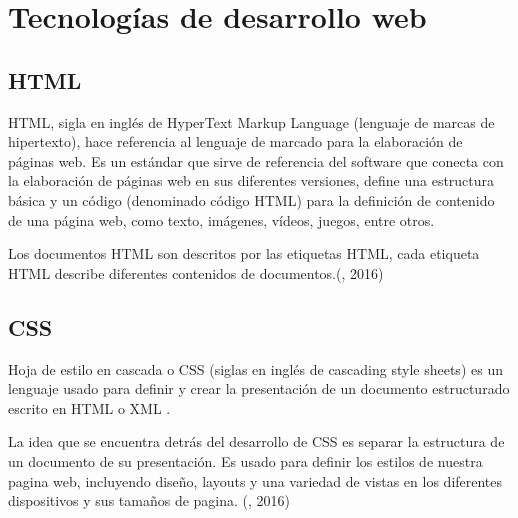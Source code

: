 

		
		




\section{Tecnologías de desarrollo web}

\subsection{HTML}

\setlength{\parskip}{5mm}

HTML, sigla en inglés de HyperText Markup Language (lenguaje de marcas de hipertexto), hace referencia al lenguaje de marcado para la elaboración de páginas web. Es un estándar que sirve de referencia del software que conecta con la elaboración de páginas web en sus diferentes versiones, define una estructura básica y un código (denominado código HTML) para la definición de contenido de una página web, como texto, imágenes, vídeos, juegos, entre otros. 

Los documentos HTML son descritos por las etiquetas HTML, cada etiqueta HTML describe diferentes contenidos de documentos.(\citet{htmlbib}, 2016)

\setlength{\parskip}{0mm}

\subsection{CSS}
\setlength{\parskip}{5mm}
Hoja de estilo en cascada o CSS (siglas en inglés de cascading style sheets) es un lenguaje usado para definir y crear la presentación de un documento estructurado escrito en HTML o XML . 

La idea que se encuentra detrás del desarrollo de CSS es separar la estructura de un documento de su presentación. Es usado para definir los estilos de nuestra pagina web, incluyendo diseño, layouts y una variedad de vistas en los diferentes dispositivos y sus tamaños de pagina. (\citet{cssbib}, 2016)
\setlength{\parskip}{0mm}

